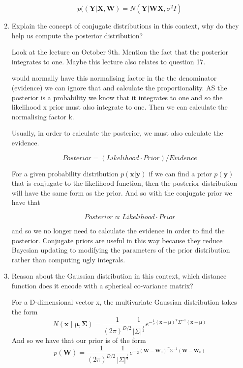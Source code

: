 \documentclass[13pt]{article}
\begin{document}
\begin{enumerate}
  \begin{equation}
      p(\left(\mathbf{Y}|\mathbf{X},\mathbf{W}\right ) = N\left(\mathbf{Y}|\mathbf{WX}, \sigma ^2 I  \right )
  \end{equation}
  
  \item {\large Explain the concept of conjugate distributions in this context, why do they help us compute the posterior distribution?\par} Look at the lecture on October 9th. Mention the fact that the posterior integrates to one. Maybe this lecture also relates to question 17.
  
  would normally have this normalising factor in the the denominator (evidence)
  we can ignore that and calculate the proportionality. AS the posterior is a probability we know that it integrates to one and so the likelihood x prior must also integrate to one. Then we can calculate the normalising factor k.
  
  Usually, in order to calculate the posterior, we must also calculate the evidence.
  
  \begin{equation}
  Posterior = (Likelihood \cdot Prior)/Evidence
  \end{equation}
  
  For a given probability distribution $p(\mathbf{x}|\mathbf{y})$ if we can find a prior $p(\mathbf{y})$ that is conjugate to the likelihood function, then the posterior distribution will have the same form as the prior. And so with the conjugate prior we have that
  
  \begin{equation}
  Posterior \propto Likelihood \cdot Prior
  \end{equation}
  
  and so we no longer need to calculate the evidence in order to find the posterior. Conjugate priors are useful in this way because they reduce Bayesian updating to modifying the parameters of the prior distribution rather than computing ugly integrals.
  
  \item {\large Reason about the Gaussian distribution in this context, which distance function does it encode with a spherical co-variance matrix?}
  
  For a D-dimensional vector x, the multivariate Gaussian distribution takes the form
  \begin{equation}
  N(\mathbf{x}\mid\mathbf{\mu}, \mathbf{\Sigma}) =  \frac{1}{{{(2\pi) }^{D/2} }}\frac{1}{|\Sigma|^{\frac{1}{2}}}e^{-\frac{1}{2}(\mathbf{x} - \mathbf{\mu})^{T}\Sigma ^{-1}(\mathbf{x} - \mathbf{\mu})}
  \end{equation}
  And so we have that our prior is of the form 
  \begin{equation}
  p(\mathbf{W}) = \frac{1}{{{(2\pi) }^{D/2} }}\frac{1}{|\Sigma|^{\frac{1}{2}}}e^{-\frac{1}{2}(\mathbf{W} - \mathbf{W}_{0})^{T}\Sigma ^{-1}(\mathbf{W} - \mathbf{W}_{0})}
  \end{equation}
  

\end{enumerate}
\end{document}
